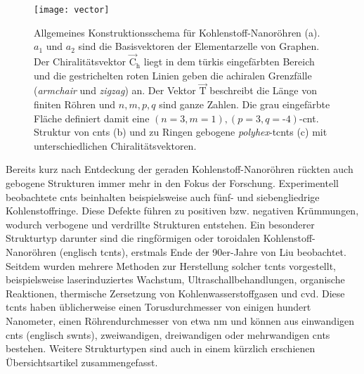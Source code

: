 \begin{figure}[ht!]
	\centering
	\texttt{[image: vector]}
	\captionsetup{figurewithin = chapter}
	\captionsetup{font=small, labelfont=bf}\caption[Allgemeines Konstruktionsschema von (toroidalen \textit{polyhex}-)Kohlenstoff-Nanoröhren]{Allgemeines Konstruktionsschema für Kohlenstoff-Nanoröhren \textsf{(a)}. $a_1$ und $a_2$ sind die Basisvektoren der Elementarzelle von Graphen. Der Chiralitätsvektor $\vec{\text{C}}_\text{h}$ liegt in dem türkis eingefärbten Bereich und die gestrichelten roten Linien geben die achiralen Grenzfälle (\textit{armchair} und \textit{zigzag}) an. Der Vektor $\vec{\text{T}}$ beschreibt die Länge von finiten Röhren und $n,m,p,q$ sind ganze Zahlen. Die grau eingefärbte Fläche definiert damit eine $(n=3,m=1),(p=3,q=\textrm{-}4)$-\ac{cnt}. Struktur von \acp{cnt} \textsf{(b)} und zu Ringen gebogene \textit{polyhex}-\acp{tcnt} \textsf{(c)} mit unterschiedlichen Chiralitätsvektoren.}
\label{abb:chiralvector}
\end{figure}
\vfill
\FloatBarrier
\newpage

Bereits kurz nach Entdeckung der geraden Kohlenstoff-Nanoröhren rückten auch gebogene Strukturen immer mehr in den Fokus der Forschung. Experimentell beobachtete \acp{cnt} beinhalten beispielsweise auch fünf- und siebengliedrige Kohlenstoffringe.\supercite{ichihashi1992pentagons} Diese Defekte führen zu positiven bzw. negativen Krümmungen, wodurch verbogene und verdrillte Strukturen entstehen. Ein besonderer Strukturtyp darunter sind die ringförmigen oder toroidalen Kohlenstoff-Nanoröhren (englisch \acfp{tcnt}), erstmals Ende der 90er-Jahre von Liu\supercite{liu1997c} beobachtet. Seitdem wurden mehrere Methoden zur Herstellung solcher \acp{tcnt} vorgestellt, beispielsweise laserinduziertes Wachstum,\supercite{liu1997c} Ultraschallbehandlungen,\supercite{martel1999rings,martel1999ring} organische Reaktionen,\supercite{sano2001ring,geng2008synthesis} thermische Zersetzung von Kohlenwasserstoffgasen\supercite{ahlskog1999ring} und \ac{cvd}\supercite{song2006large,zhou2006ring}. Diese \acp{tcnt} haben üblicherweise einen Torusdurchmesser von einigen hundert Nanometer, einen Röhrendurchmesser von etwa \unit[5--20]{nm} und können aus einwandigen \acp{cnt} (englisch \acp{swnt}),\supercite{martel1999rings,martel1999ring,sano2001ring,geng2008synthesis,komatsu2006ultrasonic,guo2007spontaneously} zweiwandigen,\supercite{colomer2003rings} dreiwandigen\supercite{yu2006rings} oder mehrwandigen\supercite{ahlskog1999ring} \acp{cnt} bestehen. Weitere Strukturtypen sind auch in einem kürzlich erschienen Übersichtsartikel\supercite{liu2014curved} zusammengefasst.

